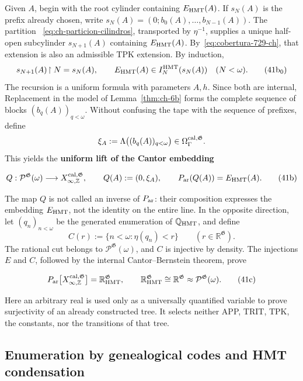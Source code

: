 Given \(A\), begin with the root cylinder containing \(E_{\rm HMT}(A)\). If
\(s_N(A)\) is the prefix already chosen, write
\(s_N(A)=(0;b_0(A),\ldots,b_{N-1}(A))\). The partition
~\eqref{eq:ch-particion-cilindros}, transported by \(\eta^{-1}\), supplies a
unique half-open subcylinder \(s_{N+1}(A)\) containing
\(E_{\rm HMT}(A)\). By~\eqref{eq:cobertura-729-ch}, that extension is also an
admissible TPK extension. By induction,
\[
 s_{N+1}(A)\!\upharpoonright N=s_N(A),\qquad
 E_{\rm HMT}(A)\in I_N^{\rm HMT}(s_N(A))\quad(N<\omega).
\tag{41b$_0$}\label{eq:ch-prefijos-uniformes}
\]
The recursion is a uniform formula with parameters \(A,h\). Since both are
internal, Replacement in the model of Lemma~\ref{thm:ch-6b} forms the complete
sequence of blocks \((b_q(A))_{q<\omega}\). Without confusing the tape with
the sequence of prefixes, define
\[
 \xi_A:=\Lambda\bigl((b_q(A))_{q<\omega}\bigr)
 \in\Omega_\Gamma^{\rm cal,\mathfrak G}.
\]
This yields the \textbf{uniform lift of the Cantor embedding}

\[
 Q:\mathcal P^{\mathfrak G}(\omega)
 \longrightarrow X_{\infty,\mathbb Z}^{\rm cal,\mathfrak G},
 \qquad
 Q(A):=(0,\xi_A),\qquad
 P_{\rm ar}(Q(A))=E_{\rm HMT}(A).
\tag{41b}\label{eq:ch-levantamiento-uniforme}
\]

The map \(Q\) is not called an inverse of \(P_{\rm ar}\): their composition
expresses the embedding \(E_{\rm HMT}\), not the identity on the entire line.
In the opposite direction, let \((q_n)_{n<\omega}\) be the generated
enumeration of \(\mathbb Q_{\rm HMT}\), and define
\[
 C(r):=\{n<\omega:\eta(q_n)<r\}
 \qquad(r\in\mathbb R^{\mathfrak G}).
\]
The rational cut belongs to \(\mathcal P^{\mathfrak G}(\omega)\), and \(C\)
is injective by density. The injections \(E\) and \(C\), followed by the
internal Cantor--Bernstein theorem, prove

\[
 P_{\rm ar}
 \bigl[X_{\infty,\mathbb Z}^{\rm cal,\mathfrak G}\bigr]
 =\mathbb R_{\rm HMT}^{\mathfrak G},
 \qquad
 \mathbb R_{\rm HMT}^{\mathfrak G}
 \cong\mathbb R^{\mathfrak G}
 \approx\mathcal P^{\mathfrak G}(\omega).
\tag{41c}\label{eq:ch-recta-potencia}
\]

Here an arbitrary real is used only as a universally quantified variable to
prove surjectivity of an already constructed tree. It selects neither APP,
TRIT, TPK, the constants, nor the transitions of that tree.

\subsection{Enumeration by genealogical codes and HMT condensation}

